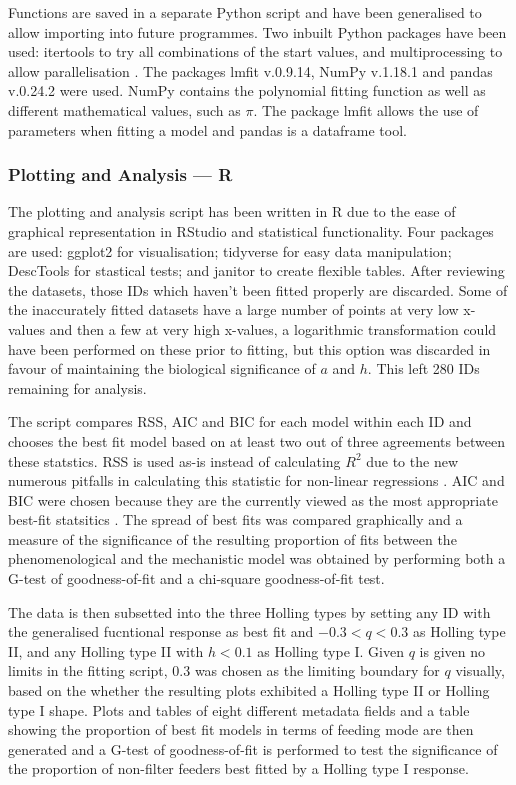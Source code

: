 \documentclass[11pt, a4paper, titlepage]{article}
\begin{document}
Functions are saved in a separate Python script and have been generalised to allow importing into future programmes. Two inbuilt Python packages have been used: itertools to try all combinations of the start values, and multiprocessing to allow parallelisation \parencite{Python}. The packages lmfit \parencite{lmfit} v.0.9.14, NumPy \parencite{NumPy} v.1.18.1 and pandas \parencite{pandas} v.0.24.2 were used. NumPy contains the polynomial fitting function as well as different mathematical values, such as $\pi$. The package lmfit allows the use of parameters when fitting a model and pandas is a dataframe tool.

\subsubsection{Plotting and Analysis — R}
The plotting and analysis script has been written in R due to the ease of graphical representation in RStudio and statistical functionality. Four packages are used: ggplot2 \parencite{ggplot2} for visualisation; tidyverse \parencite{tidyverse} for easy data manipulation; DescTools {\parencite{DescTools}}  for stastical tests; and janitor \parencite{janitor} to create flexible tables. After reviewing the datasets, those IDs which haven't been fitted properly are discarded. Some of the inaccurately fitted datasets have a large number of points at very low x-values and then a few at very high x-values, a logarithmic transformation could have been performed on these prior to fitting, but this option was discarded in favour of maintaining the biological significance of $a$ and $h$. This left 280 IDs remaining for analysis.

The script compares RSS, AIC and BIC for each model within each ID and chooses the best fit model based on at least two out of three agreements between these statstics. RSS is used as-is instead of calculating $R^{2}$ due to the new numerous pitfalls in calculating this statistic for non-linear regressions \parencite{kvalseth1985}.
AIC and BIC were chosen because they are the currently viewed as the most appropriate best-fit statsitics \parencite{Johnson2004}. The spread of best fits was compared graphically and a measure of the significance of the resulting proportion of fits between the phenomenological and the mechanistic model was obtained by performing both a G-test of goodness-of-fit and a chi-square goodness-of-fit test. 

The data is then subsetted into the three Holling types by setting any ID with the generalised fucntional response as best fit and $-0.3<q<0.3$ as Holling type II, and any Holling type II with $h<0.1$ as Holling type I. Given $q$ is given no limits in the fitting script, $0.3$ was chosen as the limiting boundary for $q$ visually, based on the whether the resulting plots exhibited a Holling type II or Holling type I shape.
Plots and tables of eight different metadata fields and a table showing the proportion of best fit models in terms of feeding mode are then generated and a G-test of goodness-of-fit is performed to test the significance of the proportion of non-filter feeders best fitted by a Holling type I response.
\end{document}
